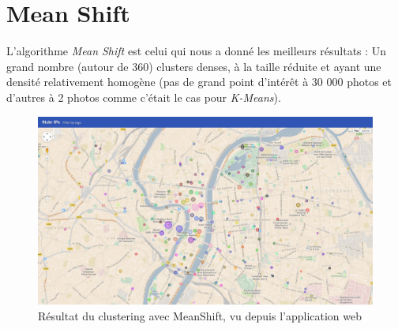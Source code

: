 \section{Mean Shift}
    L'algorithme \textit{Mean Shift} est celui qui nous a donné les meilleurs résultats : Un grand nombre (autour de 360) clusters denses,
    à la taille réduite et ayant une densité relativement homogène (pas de grand point d’intérêt à 30 000 photos et d'autres à 2 photos
    comme c'était le cas pour \textit{K-Means}).

    \begin{figure}[H]
        \centering
        \includegraphics[scale=0.25]{../screenshots/ui-global.png}
        \caption{Résultat du clustering avec MeanShift, vu depuis l'application web}
        \label{diagram:ui-global-clustering}
    \end{figure}
